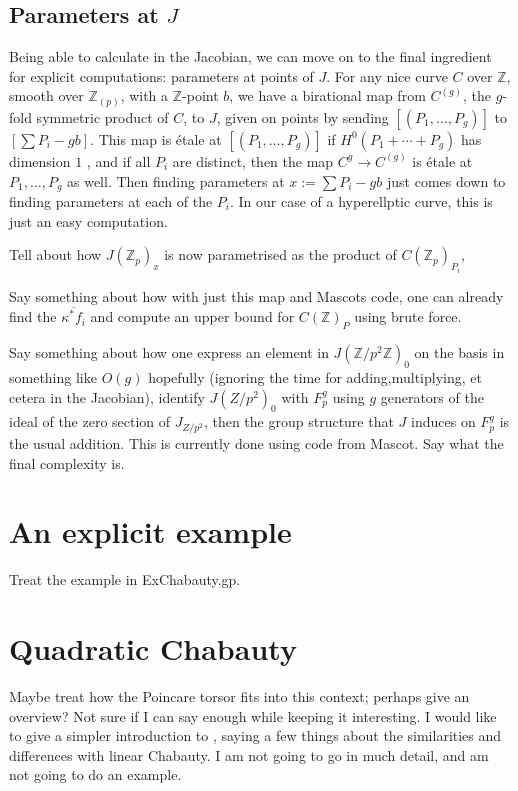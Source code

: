 \documentclass[12pt]{article}
\newcommand{\Z}{\mathbb{Z}}
\theoremstyle{plain}
\theoremstyle{definition}
\theoremstyle{remark}
\begin{document}
\subsection{Parameters at $J$}
\label{subs:paramj}
Being able to calculate in the Jacobian, we can move on to the final ingredient for explicit computations: parameters at points of $J$. For any nice curve $C$ over $\Z$, smooth over $\Z_{(p)}$, with a $\Z$-point $b$, we have a birational map from $C^{(g)}$, the $g$-fold symmetric product of $C$, to $J$, given on points by sending $[(P_1,\dots,P_g)]$ to $[\sum P_i - gb]$. This map is \'etale at $[(P_1,\dots,P_g)]$ if $H^0(P_1 + \cdots + P_g)$ has dimension $1$ , and if all $P_i$ are distinct, then the map $C^g \to C^{(g)}$ is \'etale at $P_1,\dots,P_g$ as well. Then finding parameters at $x := \sum P_i - gb$ just comes down to finding parameters at each of the $P_i$. In our case of a hyperellptic curve, this is just an easy computation.

Tell about how $J(\Z_p)_x$ is now parametrised as the product of $C(\Z_p)_{P_i}$, 

Say something about how with just this map and Mascots code, one can already find the $\overline{\kappa^* f_i} $ and compute an upper bound for $C(\Z)_P$ using brute force.

Say something about how one express an element in $J(\Z/p^2\Z)_0$ on the basis in something like $O(g)$ hopefully (ignoring the time for adding,multiplying, et cetera in the Jacobian), identify $J(Z/p^2)_0$ with $F_p^g$ using $g$ generators of the ideal of the zero section of $J_{Z/p^2}$, then the group structure that $J$ induces on $F_p^g$ is the usual addition. This is currently done using code from Mascot. Say what the final complexity is.

\section{An explicit example}
Treat the example in ExChabauty.gp.

\section{Quadratic Chabauty}
Maybe treat how the Poincare torsor fits into this context; perhaps give an overview? Not sure if I can say enough while keeping it interesting. I would like to give a simpler introduction to \citep{edixhoven20}, saying a few things about the similarities and differences with linear Chabauty. I am not going to go in much detail, and am not going to do an example.

\newpage


\end{document}
